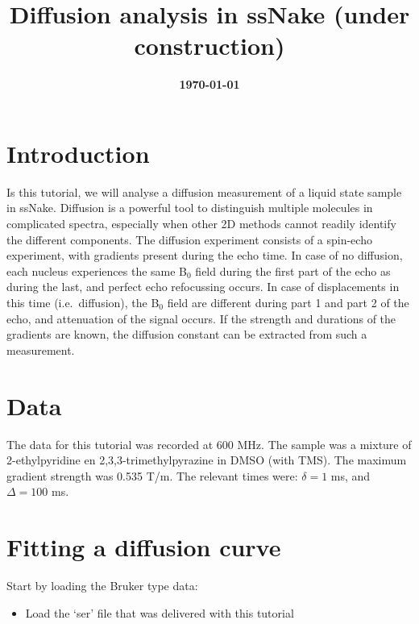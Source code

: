 \documentclass[11pt,a4paper]{article}
\title{\color{black}\fontfamily{SourceSansPro-LF}\bfseries Diffusion analysis in ssNake (under
construction)}
\author{}
\date{\color{black}\fontfamily{SourceSansPro-LF}\bfseries \today}
\begin{document}

\maketitle

\section{Introduction}
Is this tutorial, we will analyse a diffusion measurement of a liquid state sample in ssNake.
Diffusion is a powerful tool to distinguish multiple molecules in complicated spectra, especially when
other 2D methods cannot readily identify the different components. The diffusion experiment consists
of a spin-echo experiment, with gradients present during the echo time. In case of no diffusion,
each nucleus experiences the same B$_0$ field during the first part of the echo as during the last,
and perfect echo refocussing occurs. In case of displacements in this time (i.e.\ diffusion), the
B$_0$ field are different during part 1 and part 2 of the echo, and attenuation of the signal occurs.
If the strength and durations of the gradients are known, the diffusion constant can be extracted
from such a measurement.


\section{Data}
The data for this tutorial was recorded at 600 MHz.
The sample was a mixture of 2-ethylpyridine en 2,3,3-trimethylpyrazine in DMSO (with TMS).
The maximum gradient strength was 0.535 T/m. The relevant times were: $\delta = 1$ ms, and $\Delta =
100$ ms.

\section{Fitting a diffusion curve}
Start by loading the Bruker type data:
\begin{itemize}
  \item Load the `ser' file that was delivered with this tutorial
\end{itemize}
\end{document}
